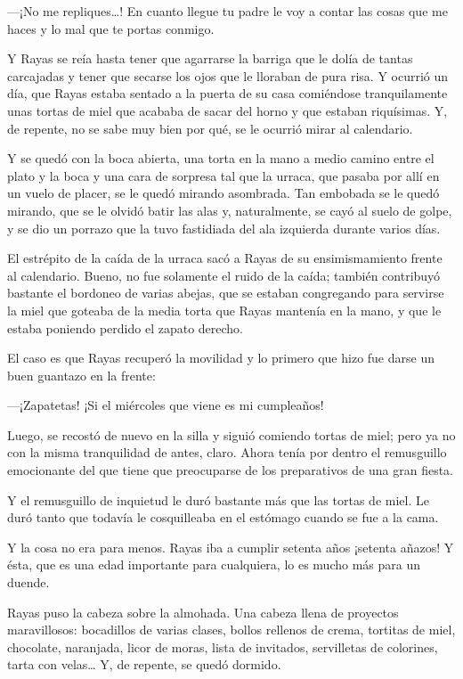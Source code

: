 \documentclass{barcodevapor3pags}
\begin{document}
---¡No me repliques\ldots! En cuanto llegue tu padre le voy a contar las
cosas que me haces y lo mal que te portas conmigo.

Y Rayas se reía hasta tener que agarrarse la barriga que le dolía de
tantas carcajadas y tener que secarse los ojos que le lloraban de pura
risa.
Y ocurrió un día, que Rayas estaba sentado a la puerta de su casa
comiéndose tranquilamente unas tortas de miel que acababa de sacar del
horno y que estaban riquísimas. Y, de repente, no se sabe muy bien por
qué, se le ocurrió mirar al calendario.

Y se quedó con la boca abierta, una torta en la mano a medio camino
entre el plato y la boca y una cara de sorpresa tal que la urraca, que
pasaba por allí en un vuelo de placer, se le quedó mirando asombrada.
Tan embobada se le quedó mirando, que se le olvidó batir las alas y,
naturalmente, se cayó al suelo de golpe, y se dio un porrazo que la tuvo
fastidiada del ala izquierda durante varios días.

El estrépito de la caída de la urraca sacó a Rayas de su ensimismamiento
frente al calendario. Bueno, no fue solamente el ruido de la caída;
también contribuyó bastante el bordoneo de varias abejas, que se estaban
congregando para servirse la miel que goteaba de la media torta que
Rayas mantenía en la mano, y que le estaba poniendo perdido el zapato
derecho.

El caso es que Rayas recuperó la movilidad y lo primero que hizo fue
darse un buen guantazo en la frente:

---¡Zapatetas! ¡Si el miércoles que viene es mi cumpleaños!

Luego, se recostó de nuevo en la silla y siguió comiendo tortas de miel;
pero ya no con la misma tranquilidad de antes, claro. Ahora tenía por
dentro el remusguillo emocionante del que tiene que preocuparse de los
preparativos de una gran fiesta.

Y el remusguillo de inquietud le duró bastante más que las tortas de
miel. Le duró tanto que todavía le cosquilleaba en el estómago cuando se
fue a la cama.

Y la cosa no era para menos. Rayas iba a cumplir setenta años ¡setenta
añazos! Y ésta, que es una edad importante para cualquiera, lo es mucho
más para un duende.

Rayas puso la cabeza sobre la almohada. Una cabeza llena de proyectos
maravillosos: bocadillos de varias clases, bollos rellenos de crema,
tortitas de miel, chocolate, naranjada, licor de moras, lista de
invitados, servilletas de colorines, tarta con velas\ldots{} Y, de
repente, se quedó dormido.
\end{document}
